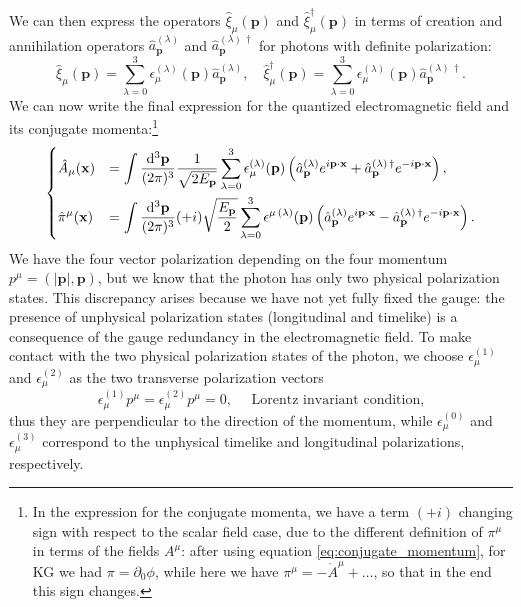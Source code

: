 We can then express the operators \(\hat{\xi}_{\mu}(\mathbf{p})\) and \(\hat{\xi}_{\mu}^{\dagger}(\mathbf{p})\) in terms of creation and annihilation operators \(\hat{a}^{(\lambda)}_{\mathbf{p}}\) and \(\hat{a}^{(\lambda)\,\dagger}_{\mathbf{p}}\) for photons with definite polarization:
\[
    \hat{\xi}_{\mu}(\mathbf{p}) = \sum_{\lambda=0}^{3} \epsilon_{\mu}^{(\lambda)}(\mathbf{p}) \hat{a}^{(\lambda)}_{\mathbf{p}}, \quad \hat{\xi}_{\mu}^{\dagger}(\mathbf{p}) = \sum_{\lambda=0}^{3} \epsilon_{\mu}^{(\lambda)}(\mathbf{p}) \hat{a}^{(\lambda)\,\dagger}_{\mathbf{p}}.
\]
We can now write the final expression for the quantized electromagnetic field and its conjugate momenta:\footnote{In the expression for the conjugate momenta, we have a term \((+i)\) changing sign with respect to the scalar field case, due to the different definition of \(\pi^{\mu}\) in terms of the fields \(A^{\mu}\): after using equation \eqref{eq:conjugate_momentum}, for KG we had \(\pi = \partial_0 \phi\), while here we have \(\pi^{\mu} = - \dot{A}^{\mu} + \dots\), so that in the end this sign changes.}
\begin{equation}
    \begin{dcases}
        \hat{A}_\mu(\mathbf{x})   & = \int \frac{\mathrm{d}^3 \mathbf{p}}{(2\pi)^3} \frac{1}{\sqrt{2 E_{\mathbf{p}}}} \sum_{\lambda=0}^{3} \epsilon_{\mu}^{(\lambda)}(\mathbf{p}) \left( \hat{a}^{(\lambda)}_{\mathbf{p}} e^{i \mathbf{p} \cdot \mathbf{x}} + \hat{a}^{(\lambda)\,\dagger}_{\mathbf{p}} e^{-i \mathbf{p} \cdot \mathbf{x}} \right),   \\
        \hat{\pi}^\mu(\mathbf{x}) & = \int \frac{\mathrm{d}^3 \mathbf{p}}{(2\pi)^3} (+i) \sqrt{\frac{E_{\mathbf{p}}}{2}} \sum_{\lambda=0}^{3} \epsilon^{\mu\,(\lambda)}(\mathbf{p}) \left( \hat{a}^{(\lambda)}_{\mathbf{p}} e^{i \mathbf{p} \cdot \mathbf{x}} - \hat{a}^{(\lambda)\,\dagger}_{\mathbf{p}} e^{-i \mathbf{p} \cdot \mathbf{x}} \right).
    \end{dcases}
    \label{eq:field_momenta_expansion_ladder_em}
\end{equation}
We have the four vector polarization depending on the four momentum \(p^{\mu} = \left(\vert \mathbf{p} \vert, \mathbf{p} \right)\), but we know that the photon has only two physical polarization states. This discrepancy arises because we have not yet fully fixed the gauge: the presence of unphysical polarization states (longitudinal and timelike) is a consequence of the gauge redundancy in the electromagnetic field. To make contact with the two physical polarization states of the photon, we choose \(\epsilon^{(1)}_{\mu}\) and \(\epsilon^{(2)}_{\mu}\) as the two transverse polarization vectors
\[
    \epsilon^{(1)}_{\mu} p^{\mu} = \epsilon^{(2)}_{\mu} p^{\mu} = 0,\quad \text{ Lorentz invariant condition,}
\]
thus they are perpendicular to the direction of the momentum, while \(\epsilon^{(0)}_{\mu}\) and \(\epsilon^{(3)}_{\mu}\) correspond to the unphysical timelike and longitudinal polarizations, respectively.

